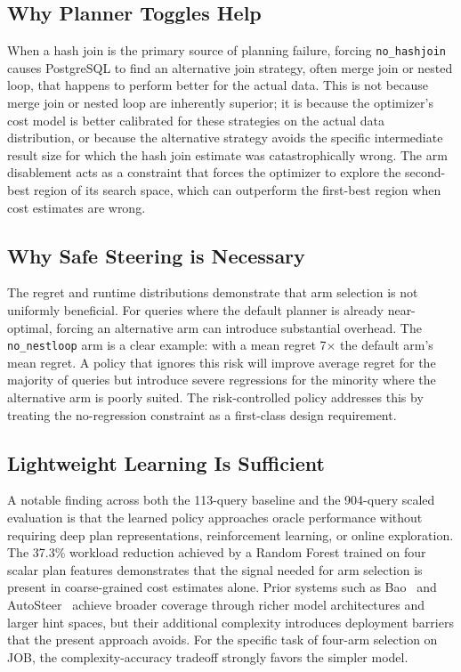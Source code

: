 \documentclass[sigconf,natbib=false]{article}
\newcommand{\postgres}{PostgreSQL}
\newcommand{\arm}[1]{\texttt{#1}}
\begin{document}
\subsection{Why Planner Toggles Help}

When a hash join is the primary source of planning failure, forcing \arm{no\_hashjoin} causes
\postgres{} to find an alternative join strategy, often merge join or nested loop, that
happens to perform better for the actual data. This is not because merge join or nested loop
are inherently superior; it is because the optimizer's cost model is better calibrated for
these strategies on the actual data distribution, or because the alternative strategy avoids
the specific intermediate result size for which the hash join estimate was catastrophically
wrong. The arm disablement acts as a constraint that forces the optimizer to explore the
second-best region of its search space, which can outperform the first-best region when cost
estimates are wrong.

\subsection{Why Safe Steering is Necessary}

The regret and runtime distributions demonstrate that arm selection is not uniformly
beneficial. For queries where the default planner is already near-optimal, forcing an
alternative arm can introduce substantial overhead. The \arm{no\_nestloop} arm is a clear example:
with a mean regret 7$\times$ the default arm's mean regret. A policy that ignores this risk
will improve average regret for the majority of queries but introduce severe regressions for
the minority where the alternative arm is poorly suited. The risk-controlled policy addresses
this by treating the no-regression constraint as a first-class design requirement.

\subsection{Lightweight Learning Is Sufficient}

A notable finding across both the 113-query baseline and the 904-query scaled evaluation is
that the learned policy approaches oracle performance without requiring deep plan
representations, reinforcement learning, or online exploration. The 37.3\% workload
reduction achieved by a Random Forest trained on four scalar plan features demonstrates
that the signal needed for arm selection is present in coarse-grained cost estimates alone.
Prior systems such as Bao~\cite{Marcus2021Bao} and AutoSteer~\cite{Anneser2023} achieve
broader coverage through richer model architectures and larger hint spaces, but their
additional complexity introduces deployment barriers that the present approach avoids. For
the specific task of four-arm selection on JOB, the complexity-accuracy tradeoff strongly
favors the simpler model.
\end{document}

